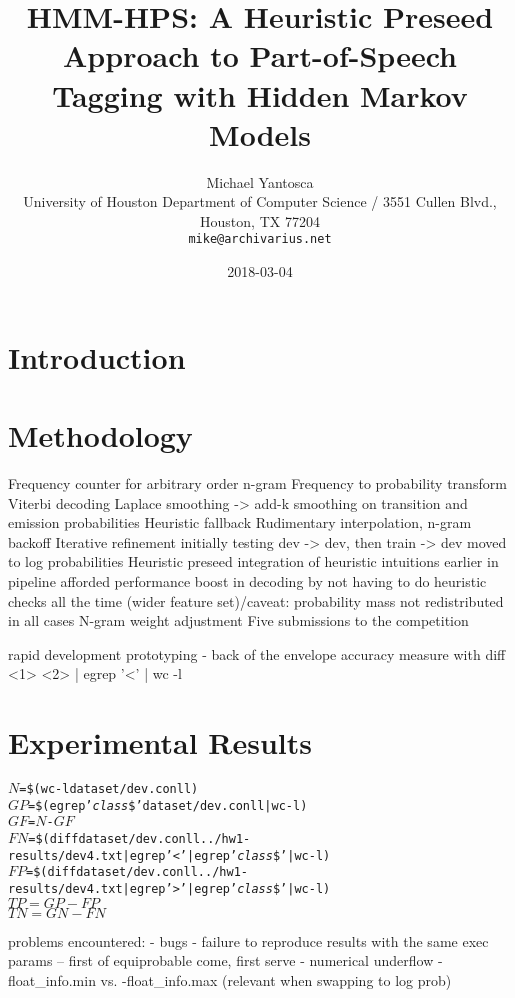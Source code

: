 \documentclass[11pt,a4paper]{article}
\title{HMM-HPS: A Heuristic Preseed Approach to Part-of-Speech Tagging with Hidden Markov Models}
\author{Michael Yantosca \\
  University of Houston Department of Computer Science / 3551 Cullen Blvd., Houston, TX 77204 \\
  {\tt mike@archivarius.net} \\}
\date{2018-03-04}
\begin{document}
\maketitle
\begin{abstract}
\end{abstract}

\section{Introduction}

\section{Methodology}

Frequency counter for arbitrary order n-gram
Frequency to probability transform
Viterbi decoding
Laplace smoothing -> add-k smoothing on transition and emission probabilities
Heuristic fallback
Rudimentary interpolation, n-gram backoff
Iterative refinement initially testing dev -> dev, then train -> dev
moved to log probabilities
Heuristic preseed
integration of heuristic intuitions earlier in pipeline afforded performance boost in decoding by not having to do heuristic checks all the time (wider feature set)/caveat: probability mass not redistributed in all cases
N-gram weight adjustment
Five submissions to the competition

rapid development prototyping - back of the envelope accuracy measure with diff <1> <2> | egrep '<' | wc -l

\section{Experimental Results}

\begin{alltt}
  $N$ = \$(wc -l dataset/dev.conll)
  $GP$ = \$(egrep '\emph{class}\$' dataset/dev.conll | wc -l)
  $GF$ = $N$ - $GF$
  $FN$ = \$(diff dataset/dev.conll ../hw1-results/dev4.txt | egrep '<' | egrep '\emph{class}\$' | wc -l)
  $FP$ = \$(diff dataset/dev.conll ../hw1-results/dev4.txt | egrep '>' | egrep '\emph{class}\$' | wc -l)
  $TP = GP - FP$
  $TN = GN - FN$
\end{alltt}

problems encountered:
- bugs
- failure to reproduce results with the same exec params
-- first of equiprobable come, first serve
- numerical underflow
- float\_info.min vs. -float\_info.max (relevant when swapping to log prob)
\end{document}
